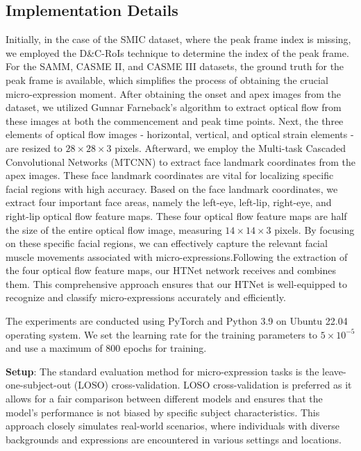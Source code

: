 \documentclass[review,12pt, 3p]{elsarticle}
\begin{document}
\subsection{Implementation Details}
Initially, in the case of the SMIC dataset, where the peak frame index is missing, we employed the D\&C-RoIs technique \cite{ref-39} to determine the index of the peak frame. For the SAMM, CASME II, and CASME III datasets, the ground truth for the peak frame is available, which simplifies the process of obtaining the crucial micro-expression moment. After obtaining the onset and apex images from the dataset, we utilized Gunnar Farneback's algorithm \cite{ref-41} to extract optical flow from these images at both the commencement and peak time points.  Next, the three elements of optical flow images - horizontal, vertical, and optical strain elements - are resized to $28 \times 28 \times 3$ pixels. Afterward, we employ the Multi-task Cascaded Convolutional Networks (MTCNN) \cite{ref-42} to extract face landmark coordinates from the apex images. These face landmark coordinates are vital for localizing specific facial regions with high accuracy. Based on the face landmark coordinates, we extract four important face areas, namely the left-eye, left-lip, right-eye, and right-lip optical flow feature maps. These four optical flow feature maps are half the size of the entire optical flow image, measuring $14 \times 14 \times 3$ pixels. By focusing on these specific facial regions, we can effectively capture the relevant facial muscle movements associated with micro-expressions.Following the extraction of the four optical flow feature maps, our HTNet network receives and combines them. This comprehensive approach ensures that our HTNet is well-equipped to recognize and classify micro-expressions accurately and efficiently.

The experiments are conducted using PyTorch and Python 3.9 on Ubuntu 22.04 operating system. We set the learning rate for the training parameters to $5 \times 10^{-5}$ and use a maximum of 800 epochs for training. 

\textbf{Setup}: The standard evaluation method for micro-expression tasks is the leave-one-subject-out (LOSO) cross-validation. LOSO cross-validation is preferred as it allows for a fair comparison between different models and ensures that the model's performance is not biased by specific subject characteristics. This approach closely simulates real-world scenarios, where individuals with diverse backgrounds and expressions are encountered in various settings and locations. 
\end{document}
